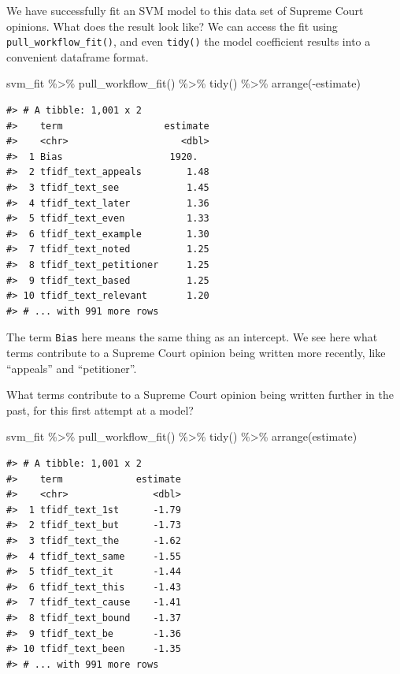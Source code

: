 \documentclass[
]{krantz}
\makeatletter
\newenvironment{Shaded}{\begin{snugshade}}{\end{snugshade}}
\newcommand{\FunctionTok}[1]{\textcolor[rgb]{0.00,0.00,0.00}{#1}}
\newcommand{\NormalTok}[1]{#1}
\newcommand{\SpecialCharTok}[1]{\textcolor[rgb]{0.00,0.00,0.00}{#1}}
\newenvironment{kframe}{%
\medskip{}
\setlength{\fboxsep}{.8em}
 \def\at@end@of@kframe{}%
 \ifinner\ifhmode%
  \def\at@end@of@kframe{\end{minipage}}%
  \begin{minipage}{\columnwidth}%
 \fi\fi%
 \def\FrameCommand##1{\hskip\@totalleftmargin \hskip-\fboxsep
 \colorbox{shadecolor}{##1}\hskip-\fboxsep
     \hskip-\linewidth \hskip-\@totalleftmargin \hskip\columnwidth}%
 \MakeFramed {\advance\hsize-\width
   \@totalleftmargin\z@ \linewidth\hsize
   \@setminipage}}%
 {\par\unskip\endMakeFramed%
 \at@end@of@kframe}
\renewenvironment{Shaded}{\begin{kframe}}{\end{kframe}}
\makeatother
\begin{document}
We have successfully fit an SVM model to this data set of Supreme Court opinions. What does the result look like? We can access the fit using \texttt{pull\_workflow\_fit()}, and even \texttt{tidy()} the model coefficient results into a convenient dataframe format.

\begin{Shaded}
\begin{Highlighting}[]
\NormalTok{svm\_fit }\SpecialCharTok{\%\textgreater{}\%}
  \FunctionTok{pull\_workflow\_fit}\NormalTok{() }\SpecialCharTok{\%\textgreater{}\%}
  \FunctionTok{tidy}\NormalTok{() }\SpecialCharTok{\%\textgreater{}\%}
  \FunctionTok{arrange}\NormalTok{(}\SpecialCharTok{{-}}\NormalTok{estimate)}
\end{Highlighting}
\end{Shaded}

\begin{verbatim}
#> # A tibble: 1,001 x 2
#>    term                  estimate
#>    <chr>                    <dbl>
#>  1 Bias                   1920.  
#>  2 tfidf_text_appeals        1.48
#>  3 tfidf_text_see            1.45
#>  4 tfidf_text_later          1.36
#>  5 tfidf_text_even           1.33
#>  6 tfidf_text_example        1.30
#>  7 tfidf_text_noted          1.25
#>  8 tfidf_text_petitioner     1.25
#>  9 tfidf_text_based          1.25
#> 10 tfidf_text_relevant       1.20
#> # ... with 991 more rows
\end{verbatim}

The term \texttt{Bias} here means the same thing as an intercept. We see here what terms contribute to a Supreme Court opinion being written more recently, like ``appeals'' and ``petitioner''.

What terms contribute to a Supreme Court opinion being written further in the past, for this first attempt at a model?

\begin{Shaded}
\begin{Highlighting}[]
\NormalTok{svm\_fit }\SpecialCharTok{\%\textgreater{}\%}
  \FunctionTok{pull\_workflow\_fit}\NormalTok{() }\SpecialCharTok{\%\textgreater{}\%}
  \FunctionTok{tidy}\NormalTok{() }\SpecialCharTok{\%\textgreater{}\%}
  \FunctionTok{arrange}\NormalTok{(estimate)}
\end{Highlighting}
\end{Shaded}

\begin{verbatim}
#> # A tibble: 1,001 x 2
#>    term             estimate
#>    <chr>               <dbl>
#>  1 tfidf_text_1st      -1.79
#>  2 tfidf_text_but      -1.73
#>  3 tfidf_text_the      -1.62
#>  4 tfidf_text_same     -1.55
#>  5 tfidf_text_it       -1.44
#>  6 tfidf_text_this     -1.43
#>  7 tfidf_text_cause    -1.41
#>  8 tfidf_text_bound    -1.37
#>  9 tfidf_text_be       -1.36
#> 10 tfidf_text_been     -1.35
#> # ... with 991 more rows
\end{verbatim}
\end{document}
